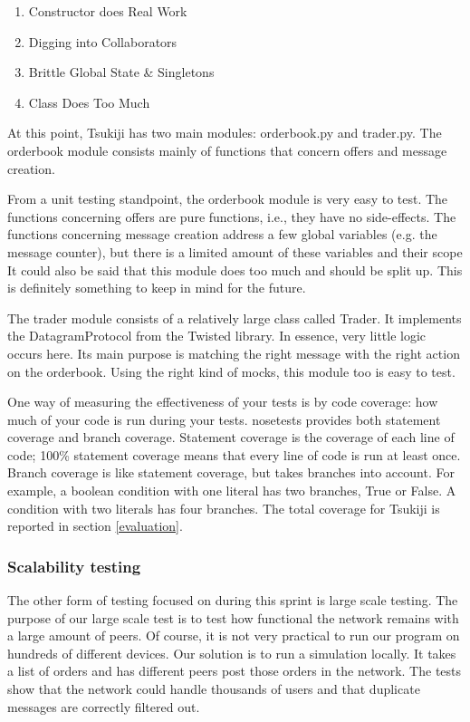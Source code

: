 \begin{enumerate}
\item Constructor does Real Work
\item Digging into Collaborators
\item Brittle Global State \& Singletons
\item Class Does Too Much
\end{enumerate}

At this point, Tsukiji has two main modules: orderbook.py and trader.py.
The orderbook module consists mainly of functions that concern offers and message creation.

From a unit testing standpoint, the orderbook module is very easy to test.
The functions concerning offers are pure functions, i.e., they have no side-effects.
The functions concerning message creation address a few global variables (e.g. the message counter), but there is a limited amount of these variables and their scope
It could also be said that this module does too much and should be split up.
This is definitely something to keep in mind for the future.

The trader module consists of a relatively large class called Trader.
It implements the DatagramProtocol from the Twisted library.
In essence, very little logic occurs here.
Its main purpose is matching the right message with the right action on the orderbook.
Using the right kind of mocks, this module too is easy to test.

One way of measuring the effectiveness of your tests is by code coverage: how much of your code is run during your tests.
nosetests provides both statement coverage and branch coverage.
Statement coverage is the coverage of each line of code; 100\% statement coverage means that every line of code is run at least once.
Branch coverage is like statement coverage, but takes branches into account.
For example, a boolean condition with one literal has two branches, True or False.
A condition with two literals has four branches.
The total coverage for Tsukiji is reported in section \ref{evaluation}.


\subsubsection{Scalability testing}
The other form of testing focused on during this sprint is large scale testing.
The purpose of our large scale test is to test how functional the network remains with a large amount of peers.
Of course, it is not very practical to run our program on hundreds of different devices.
Our solution is to run a simulation locally.
It takes a list of orders and has different peers post those orders in the network.
The tests show that the network could handle thousands of users and that duplicate messages are correctly filtered out.